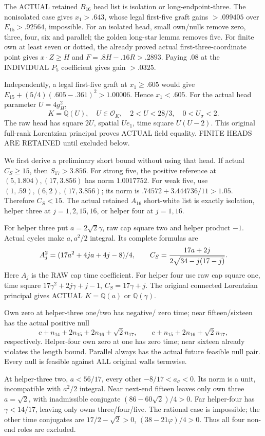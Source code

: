 The ACTUAL retained \(B_{16}\) head list is
isolation or long-endpoint-three.
The nonisolated case gives \(x_1>.643\),
whose legal first-five graft gains \(>.099405\)
over \(E_{15}>.92564\), impossible.
For an isolated head, small own/nulls remove
zero, three, four, six and parallel;
the golden long-star lemma removes five.
For finite own at least seven or dotted, the
already proved actual first-three-coordinate
point gives \(x\cdot Z\ge H\) and
\(F=.8H-.16R>.2893\).
Paying \(.08\) at the INDIVIDUAL \(P_5\)
coefficient gives gain \(>.0325\).

Independently, a legal first-five graft at
\(x_1\ge.605\) would give
\(E_{15}+(5/4)(.605-.361)^2>1.00006\).
Hence \(x_1<.605\).
For the actual head parameter \(U=4g_H^2\),
\[
 K=\mathbb Q(U),\quad U\in\mathcal O_K,\quad
               2<U<28/3,\quad0<U_\sigma<2 .
\]
The raw head has square \(2U\), spatial \(Ue_1\),
time square \(U(U-2)\).
This original full-rank Lorentzian principal
proves ACTUAL field equality.
FINITE HEADS ARE RETAINED until excluded below.

We first derive a preliminary short bound without
using that head.
If actual \(C_S\ge15\), then \(S_{17}>3.856\).
For strong five, the positive reference at
\((5,1.804),(17,3.856)\) has norm \(1.0017752\).
For weak five, use \((1,.59),(6,2),(17,3.856)\);
its norm is \(.74572+3.444736/11>1.05\).
Therefore \(C_S<15\).
The actual retained \(A_{16}\) short-white list
is exactly isolation, helper three at
\(j=1,2,15,16\), or helper four at \(j=1,16\).

For helper three put \(a=2\sqrt2\gamma\),
raw cap square two and helper product \(-1\).
Actual cycles make \(a,a^2/2\) integral.
Its complete formulas are
\[
 A_j^2=(17a^2+4ja+4j-8)/4,\qquad
 C_S={17a+2j\over2\sqrt{34-j(17-j)}} .
\]
Here \(A_j\) is the RAW cap time coefficient.
For helper four use raw cap square one,
time square \(17\gamma^2+2j\gamma+j-1\),
\(C_S=17\gamma+j\).
The original connected Lorentzian principal gives
ACTUAL \(K=\mathbb Q(a)\) or \(\mathbb Q(\gamma)\).

Own zero at helper-three one/two has negative/
zero time; near fifteen/sixteen has the actual
positive null
\[
 c+n_{14}+2n_{15}+2n_{16}+\sqrt2n_{17},\qquad
 c+n_{15}+2n_{16}+\sqrt2n_{17},
\]
respectively.
Helper-four own zero at one has zero time;
near sixteen already violates the length bound.
Parallel always has the actual future feasible
null pair.
Every null is feasible against ALL original
walls termwise.

At helper-three two,
\(a<56/17\), every other \(-8/17<a_\sigma<0\).
Its norm is a unit, incompatible with
\(a^2/2\) integral.
Near next-end fifteen leaves only own three
\(a=\sqrt2\), with inadmissible conjugate
\((86-60\sqrt2)/4>0\).
Far helper-four has \(\gamma<14/17\), leaving
only owns three/four/five.
The rational case is impossible;
the other time conjugates are
\(17/2-\sqrt2>0\), \((38-21\varphi)/4>0\).
Thus all four non-end roles are excluded.

